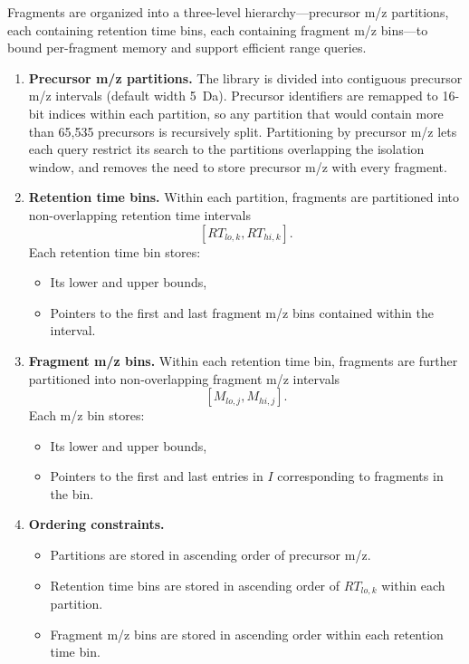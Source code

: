 \documentclass[pdflatex,sn-nature]{sn-jnl}
\begin{document}
Fragments are organized into a three-level hierarchy---precursor m/z partitions, each containing retention time bins, each containing fragment m/z bins---to bound per-fragment memory and support efficient range queries.

\begin{enumerate}

\item \textbf{Precursor m/z partitions.}
The library is divided into contiguous precursor m/z intervals (default width \SI{5}{\dalton}). Precursor identifiers are remapped to 16-bit indices within each partition, so any partition that would contain more than 65{,}535 precursors is recursively split. Partitioning by precursor m/z lets each query restrict its search to the partitions overlapping the isolation window, and removes the need to store precursor m/z with every fragment.

\item \textbf{Retention time bins.}
Within each partition, fragments are partitioned into non-overlapping retention time intervals
\[
[RT_{lo,k}, RT_{hi,k}].
\]
Each retention time bin stores:
    \begin{itemize}
        \item Its lower and upper bounds,
        \item Pointers to the first and last fragment m/z bins contained within the interval.
    \end{itemize}

\item \textbf{Fragment m/z bins.}
Within each retention time bin, fragments are further partitioned into non-overlapping fragment m/z intervals
\[
[M_{lo,j}, M_{hi,j}].
\]
Each m/z bin stores:
    \begin{itemize}
        \item Its lower and upper bounds,
        \item Pointers to the first and last entries in $I$ corresponding to fragments in the bin.
    \end{itemize}

\item \textbf{Ordering constraints.}
    \begin{itemize}
        \item Partitions are stored in ascending order of precursor m/z.
        \item Retention time bins are stored in ascending order of $RT_{lo,k}$ within each partition.
        \item Fragment m/z bins are stored in ascending order within each retention time bin.
    \end{itemize}

\end{enumerate}
\end{document}
